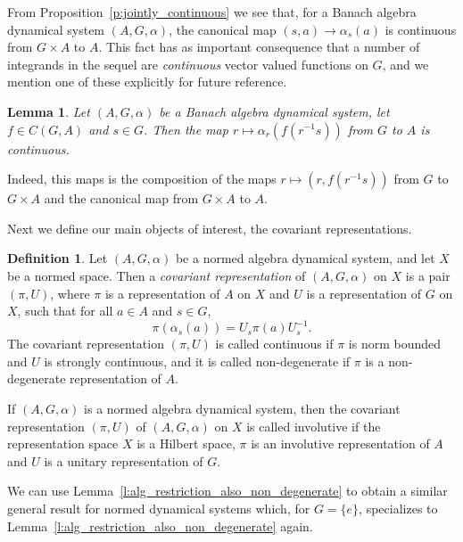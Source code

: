 \documentclass{amsart}
\theoremstyle{plain}
\newtheorem{lemma}[theorem]{Lemma}
\theoremstyle{definition}
\newtheorem{defn}[theorem]{Definition}
\numberwithin{equation}{section}
\begin{document}
From Proposition~\ref{p:jointly_continuous} we see that, for a Banach algebra dynamical system ${(A,G,\alpha)}$, the canonical map $(s,a)\to \alpha_s(a)$ is continuous from $G\times A$ to $A$. This fact has as important consequence that a number of integrands in the sequel are \emph{continuous} vector valued functions on $G$, and we mention one of these explicitly for future reference.

\begin{lemma}\label{l:map_continuous}
 Let ${(A,G,\alpha)}$ be a Banach algebra dynamical system, let $f \in C(G,A)$ and $s\in G$. Then the map $r\mapsto\alpha_{r}\left(f(r^{-1}s)\right)$ from $G$ to $A$ is continuous.
\end{lemma}

Indeed, this maps is the composition of the maps $r\mapsto (r,f(r^{-1}s))$ from $G$ to $G\times A$ and the canonical map from $G\times A$ to $A$.

Next we define our main objects of interest, the covariant representations.

\begin{defn}\label{d:covariant_representation}
Let ${(A,G,\alpha)}$ be a normed algebra dynamical system, and let $X$ be a normed space. Then a \emph{covariant representation} of ${(A,G,\alpha)}$ on $X$ is a pair $(\pi,U)$, where $\pi$ is a representation of $A$ on $X$ and $U$ is a representation of $G$ on $X$, such that for all $a\in A$ and $s\in G$,
\[
\pi(\alpha_s(a)) = U_s \pi(a) U_s^{-1} .
\]
The covariant representation $(\pi,U)$ is called continuous if $\pi$ is norm bounded and $U$ is strongly continuous, and it is called non-degenerate if $\pi$ is a non-degenerate representation of $A$.

If ${(A,G,\alpha)}$ is a normed algebra dynamical system, then the covariant representation ${(\pi,U)}$ of ${(A,G,\alpha)}$ on $X$ is called involutive if the representation space $X$ is a Hilbert space, $\pi$ is an involutive representation of $A$ and $U$ is a unitary representation of $G$.
\end{defn}

We can use Lemma~\ref{l:alg_restriction_also_non_degenerate} to obtain a similar general result for normed dynamical systems which, for $G=\{e\}$, specializes to Lemma~\ref{l:alg_restriction_also_non_degenerate} again.
\end{document}

